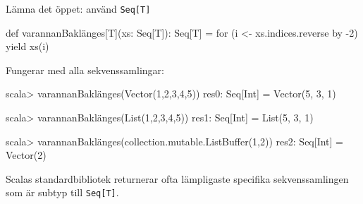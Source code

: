 \begin{Slide}{Lämna det öppet: använd \texttt{Seq[T]}}
\begin{Code}[basicstyle=\ttfamily]
def varannanBaklänges[T](xs: Seq[T]): Seq[T] = 
  for (i <- xs.indices.reverse by -2) yield xs(i) 
\end{Code}
Fungerar med alla sekvenssamlingar:
\begin{REPLnonum}
scala> varannanBaklänges(Vector(1,2,3,4,5))
res0: Seq[Int] = Vector(5, 3, 1)

scala> varannanBaklänges(List(1,2,3,4,5))
res1: Seq[Int] = List(5, 3, 1)

scala> varannanBaklänges(collection.mutable.ListBuffer(1,2))
res2: Seq[Int] = Vector(2)
\end{REPLnonum}
Scalas standardbibliotek returnerar ofta lämpligaste specifika sekvenssamlingen som är subtyp till \texttt{Seq[T]}.
\end{Slide}








